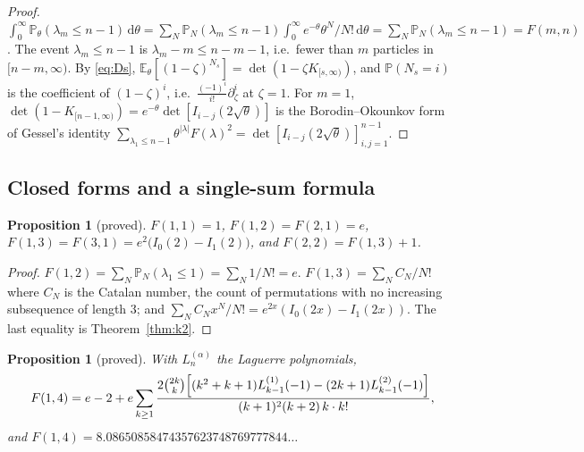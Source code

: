 \documentclass[11pt]{article}
\newtheorem{proposition}[theorem]{Proposition}
\theoremstyle{definition}
\theoremstyle{remark}
\newcommand{\E}{\mathbb{E}}
\newcommand{\Prob}{\mathbb{P}}
\newcommand{\dd}{\,\mathrm{d}}
\begin{document}
\begin{proof}
$\int_0^\infty\Prob_\theta(\lambda_m\le n-1)\dd\theta=\sum_N\Prob_N(\lambda_m\le n-1)\int_0^\infty e^{-\theta}\theta^N/N!\dd\theta=\sum_N\Prob_N(\lambda_m\le n-1)=F(m,n)$. The event $\lambda_m\le n-1$ is $\lambda_m-m\le n-m-1$, i.e.\ fewer than $m$ particles in $[n-m,\infty)$. By \eqref{eq:Ds}, $\E_\theta[(1-\zeta)^{N_s}]=\det(1-\zeta K_{[s,\infty)})$, and $\Prob(N_s=i)$ is the coefficient of $(1-\zeta)^i$, i.e.\ $\frac{(-1)^i}{i!}\partial_\zeta^i$ at $\zeta=1$. For $m=1$, $\det(1-K_{[n-1,\infty)})=e^{-\theta}\det[I_{i-j}(2\sqrt\theta)]$ is the Borodin--Okounkov form of Gessel's identity $\sum_{\lambda_1\le n-1}\theta^{|\lambda|}F(\lambda)^2=\det[I_{i-j}(2\sqrt\theta)]_{i,j=1}^{n-1}$.
\end{proof}

\subsection{Closed forms and a single-sum formula}

\begin{proposition}[proved]\label{prop:closed}
$F(1,1)=1$, $F(1,2)=F(2,1)=e$, $F(1,3)=F(3,1)=e^2\bigl(I_0(2)-I_1(2)\bigr)$, and $F(2,2)=F(1,3)+1$.
\end{proposition}

\begin{proof}
$F(1,2)=\sum_N\Prob_N(\lambda_1\le1)=\sum_N1/N!=e$. $F(1,3)=\sum_NC_N/N!$ where $C_N$ is the Catalan number, the count of permutations with no increasing subsequence of length $3$; and $\sum_NC_Nx^N/N!=e^{2x}(I_0(2x)-I_1(2x))$. The last equality is Theorem~\ref{thm:k2}.
\end{proof}

\begin{proposition}[proved]\label{prop:F14}
With $L^{(\alpha)}_n$ the Laguerre polynomials,
\begin{equation}\label{eq:F14}
F(1,4)=e-2+e\sum_{k\ge1}\frac{2\binom{2k}{k}\Bigl[(k^2+k+1)L^{(1)}_{k-1}(-1)-(2k+1)L^{(2)}_{k-1}(-1)\Bigr]}{(k+1)^2(k+2)\,k\cdot k!},
\end{equation}
and $F(1,4)=8.08650858474357623748769777844\ldots$
\end{proposition}
\end{document}
